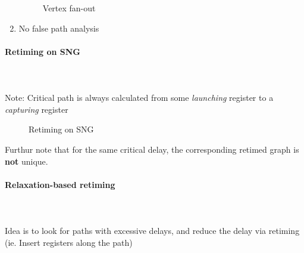 \documentclass{article}
\begin{document}
\begin{enumerate}
\begin{figure}[htp]
            \qquad
            \caption{Vertex fan-out}%
        \end{figure}
    \item No false path analysis
\end{enumerate}

\paragraph{Retiming on SNG}\mbox{}\\\\
Note: Critical path is always calculated from some \textit{launching} register to a \textit{capturing} register
    \begin{figure}[htp]%
        \centering
        \qquad
        \caption{Retiming on SNG}%
    \end{figure}

Furthur note that for the same critical delay, the corresponding retimed graph is \textbf{not} unique.


\paragraph{Relaxation-based retiming}\mbox{}\\\\
Idea is to look for paths with excessive delays, and reduce the delay via retiming (ie. Insert registers along the path)
\end{document}
